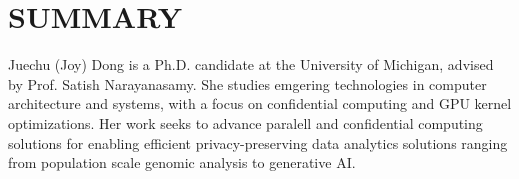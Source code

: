 \section{SUMMARY}
Juechu (Joy) Dong is a Ph.D. candidate at the University of Michigan, advised by Prof. Satish Narayanasamy. 
She studies emgering technologies in computer architecture and systems, with a focus on confidential computing and GPU kernel optimizations. Her work seeks to advance paralell and confidential computing solutions for enabling efficient privacy-preserving data analytics solutions ranging from population scale genomic analysis to generative AI.